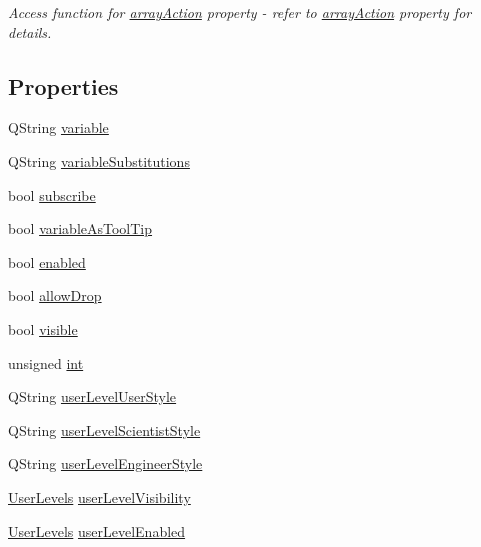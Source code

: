 \begin{DoxyCompactItemize}
\begin{DoxyCompactList}\small\item\em Access function for \hyperlink{classQECheckBox_a4d3f55ae57f2c8d5b9a315b4ffb5a3b4}{arrayAction} property -\/ refer to \hyperlink{classQECheckBox_a4d3f55ae57f2c8d5b9a315b4ffb5a3b4}{arrayAction} property for details. \end{DoxyCompactList}\end{DoxyCompactItemize}
\subsection*{Properties}
\begin{DoxyCompactItemize}
\item 
QString \hyperlink{classQECheckBox_a1d7024cc5d4615e156d0233754d903d3}{variable}
\item 
QString \hyperlink{classQECheckBox_add28ca3eec333796a42c3f4945c3ce91}{variableSubstitutions}
\item 
bool \hyperlink{classQECheckBox_a06582aa91f2ae059950ad0dd342e2f1b}{subscribe}
\item 
bool \hyperlink{classQECheckBox_a8f507578ec9249710c149b1b5f8b88c6}{variableAsToolTip}
\item 
bool \hyperlink{classQECheckBox_afff99504d598628e0b8f06c54282935b}{enabled}
\item 
bool \hyperlink{classQECheckBox_a90f3257fd26f917ee65cf4d9325bb7ec}{allowDrop}
\item 
bool \hyperlink{classQECheckBox_aece8c8fd61778af026592bae796dd8e7}{visible}
\item 
unsigned \hyperlink{classQECheckBox_a138cbbabbe82d3c60e9afd8e6f53d778}{int}
\item 
QString \hyperlink{classQECheckBox_a6e46e41202d593976b629f33b43892b5}{userLevelUserStyle}
\item 
QString \hyperlink{classQECheckBox_ad57869fb4989034ec09ef1a57ab87bb0}{userLevelScientistStyle}
\item 
QString \hyperlink{classQECheckBox_ae4c0cf42959e19b91ae4894a10c22012}{userLevelEngineerStyle}
\item 
\hyperlink{classQECheckBox_ab23fe060c72d50eaf52b879a58ee2611}{UserLevels} \hyperlink{classQECheckBox_ae919c2bf8265005e45e2c6de44839e8e}{userLevelVisibility}
\item 
\hyperlink{classQECheckBox_ab23fe060c72d50eaf52b879a58ee2611}{UserLevels} \hyperlink{classQECheckBox_a909abc180018e9564e7965454f95a85c}{userLevelEnabled}
\item 

\end{DoxyCompactItemize}
